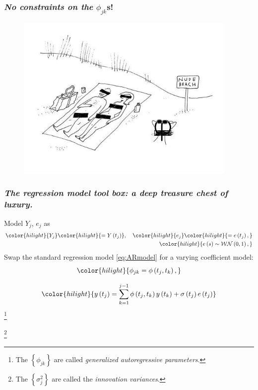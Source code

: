 \documentclass[12pt]{beamer}
\newcommand{\newmaththought}[1]{{ \color{hilight} {#1}}}
\newcommand\myfootnote[1]{%
  \begingroup
  \renewcommand\thefootnote{}\footnote{#1}%
  \addtocounter{footnote}{-1}%
  \endgroup
}
\begin{document}
\begin{frame}
\frametitle{\emph{No constraints on the} $\phi_{jk}$s!}

\begin{adjustwidth}{-3cm}{-3cm}
\begin{center}
\begin{figure}
\graphicspath{{img/}}
  \includegraphics[height=8cm]{nude-beach}
\end{figure}
\end{center}
  \end{adjustwidth}
\end{frame}





\begin{frame}
\frametitle{\emph{The regression model tool box: a deep treasure chest of luxury.}}
Model $Y_j$, $e_j$ as
\begin{align*}
\begin{split}
\newmaththought{Y_j}  \newmaththought{= Y\left( t_j \right) },\quad \newmaththought{e_j}  \newmaththought{= e\left( t_j \right),}\\
\newmaththought{e\left(s\right) \sim  \mathcal{WN}\left(0,1\right),}
\end{split}
\end{align*}
\noindent
Swap the standard regression model \ref{eq:ARmodel} for a varying coefficient model:
\begin{equation*}
\newmaththought{\phi_{jk} = \phi\left(t_j,t_k\right),}
\end{equation*}

\begin{equation}   
\newmaththought{y\left(t_j \right)  = \sum_{k=1}^{j-1} \phi\left(t_j ,t_k\right) y\left(t_k\right) + \sigma\left(t_j\right)e\left({t_j}\right)}
\label{eq:MyModel} 
\end{equation}
\myfootnote{The $\left\{ \phi_{jk} \right\}$ are called \emph{generalized autoregressive parameters}.}
\myfootnote{The $\left\{ \sigma^2_{j} \right\}$ are called the \emph{innovation variances}.}
\end{frame}
\end{document}
